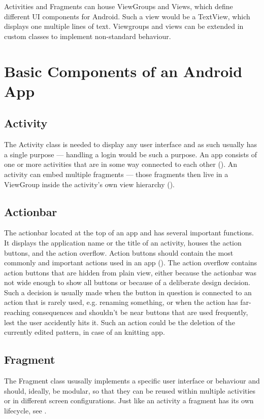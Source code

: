 Activities and Fragments can house ViewGroups and Views, which define different UI components for Android. Such a view would be a TextView, which displays one multiple lines of text. Viewgroups and views can be extended in custom classes to implement non-standard behaviour.

\section{Basic Components of an Android App}

\subsection{Activity}
The Activity class is needed to display any user interface and as such usually has a single purpose --- handling a login would be such a purpose. An app consists of one or more activities that are in some way connected to each other (\cite{activities_in_app}). An activity can embed multiple fragments --- those fragments then live in a ViewGroup inside the activity's own view hierarchy (\cite{androidfragment}).  

\subsection{Actionbar}
The actionbar located at the top of an app and has several important functions. It displays the application name or the title of an activity, houses the action buttons, and the action overflow. Action buttons should contain the most commonly and important actions used in an app (\cite{actionbar}). The action overflow contains action buttons that are hidden from plain view, either because the actionbar was not wide enough to show all buttons or because of a deliberate design decision. Such a decision is usually made when the button in question is connected to an action that is rarely used, e.g. renaming something, or when the action has far-reaching consequences and shouldn't be near buttons that are used frequently, lest the user accidently hits it. Such an action could be the deletion of the currently edited pattern, in case of an knitting app. 

\subsection{Fragment}
The Fragment class ususally implements a specific user interface or behaviour and should, ideally, be modular, so that they can be reused within multiple activities or in different screen configurations. Just like an activity a fragment has its own lifecycle, see .


